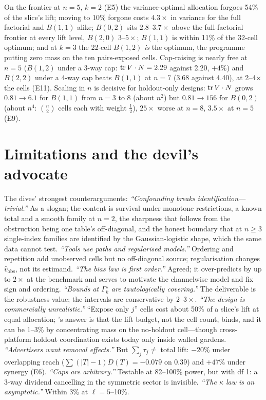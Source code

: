 On the frontier at $n = 5$, $k = 2$ (E5) the variance-optimal allocation forgoes 54\% of the slice's lift; moving to 10\% forgone costs $4.3\times$ in variance for the full factorial and $B(1,1)$ alike; $B(0,2)$ sits $2.8$--$3.7\times$ above the full-factorial frontier at every lift level, $B(2,0)$ $3$--$5\times$; $B(1,1)$ is within 11\% of the 32-cell optimum; and at $k = 3$ the 22-cell $B(1,2)$ \emph{is} the optimum, the programme putting zero mass on the ten pairs-exposed cells. Cap-raising is nearly free at $n = 5$ ($B(1,2)$ under a 3-way cap: $\operatorname{tr} V \cdot N = 2.29$ against 2.20, $+4\%$) and $B(2,2)$ under a 4-way cap beats $B(1,1)$ at $n = 7$ (3.68 against 4.40), at 2--4$\times$ the cells (E11). Scaling in $n$ is decisive for holdout-only designs: $\operatorname{tr} V \cdot N$ grows $0.81 \to 6.1$ for $B(1,1)$ from $n = 3$ to 8 (about $n^2$) but $0.81 \to 156$ for $B(0,2)$ (about $n^4$: $\binom{n}{2}$ cells each with weight $\tfrac12$), $25\times$ worse at $n = 8$, $3.5\times$ at $n = 5$ (E9).

\section{Limitations and the devil's advocate}

The dives' strongest counterarguments: \emph{``Confounding breaks identification---trivial.''} As a slogan; the content is survival under monotone restrictions, a known total and a smooth family at $n = 2$, the sharpness that follows from the obstruction being one table's off-diagonal, and the honest boundary that at $n \ge 3$ single-index families are identified by the Gaussian-logistic shape, which the same data cannot test. \emph{``Tools use paths and regularised models.''} Ordering and repetition add unobserved cells but no off-diagonal source; regularisation changes $\hat v_{\mathrm{obs}}$, not its estimand. \emph{``The bias law is first order.''} Agreed; it over-predicts by up to $2\times$ at the benchmark and serves to motivate the channelwise model and fix sign and ordering. \emph{``Bounds at $\Gamma_k^\star$ are tautologically covering.''} The deliverable is the robustness value; the intervals are conservative by $2$--$3\times$. \emph{``The design is commercially unrealistic.''} ``Expose only $j$'' cells cost about 50\% of a slice's lift at equal allocation; 's answer is that the lift budget, not the cell count, binds, and it can be 1--3\% by concentrating mass on the no-holdout cell---though cross-platform holdout coordination exists today only inside walled gardens. \emph{``Advertisers want removal effects.''} But $\sum_j \tau_j \ne$ total lift: $-20\%$ under overlapping reach ($\sum(|T| - 1)D(T) = -0.079$ on 0.39) and $+47\%$ under synergy (E6). \emph{``Caps are arbitrary.''} Testable at 82--100\% power, but with df 1: a 3-way dividend cancelling in the symmetric sector is invisible. \emph{``The $\kappa$ law is an asymptotic.''} Within 3\% at $\ell = 5$--10\%.

